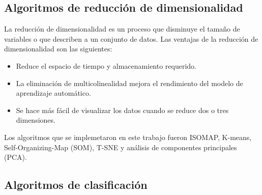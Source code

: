 \subsection{Algoritmos de reducción de dimensionalidad \label{sec:methods}}

La reducción de dimensionalidad es un proceso que disminuye el tamaño de variables o que describen a un conjunto de datos. Las ventajas de la reducción de dimensionalidad son las siguientes:

\begin{itemize}
    \item Reduce el espacio de tiempo y almacenamiento requerido.
    \item La eliminación de multicolinealidad mejora el rendimiento del modelo de aprendizaje automático.
    \item Se hace más fácil de visualizar los datos cuando se reduce dos o tres dimensiones.
\end{itemize}

Los algoritmos que se implemetaron en este trabajo fueron ISOMAP, K-means, Self-Organizing-Map (SOM), T-SNE y análisis de componentes principales (PCA).








\subsection{Algoritmos de clasificación}





